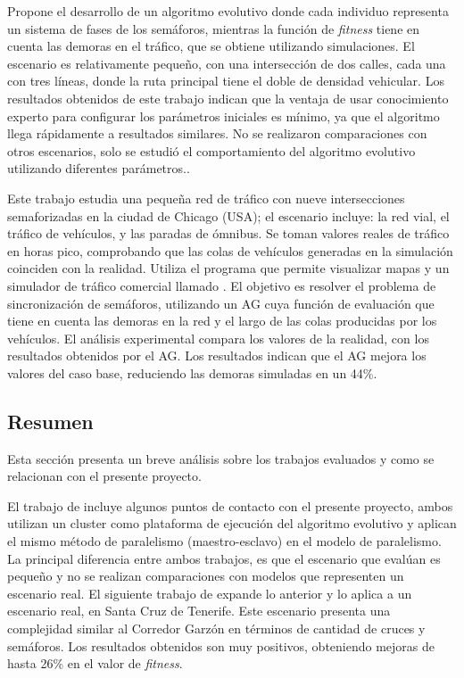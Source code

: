 \begin{itemize}
\begin{item}
Propone el desarrollo de un algoritmo evolutivo donde cada individuo representa un sistema de fases de los semáforos, mientras la función de \emph{fitness} tiene en cuenta las demoras en el tráfico, que se obtiene utilizando simulaciones. El escenario es relativamente pequeño, con una intersección de dos calles, cada una con tres líneas, donde la ruta principal tiene el doble de densidad vehicular. Los resultados obtenidos de este trabajo indican que la ventaja de usar conocimiento experto para configurar los parámetros iniciales es mínimo, ya que el algoritmo llega rápidamente a resultados similares. No se realizaron comparaciones con otros escenarios, solo se estudió el comportamiento del algoritmo evolutivo utilizando diferentes parámetros..

\end{item}	

\begin{item}

Este trabajo estudia una pequeña red de tráfico con nueve intersecciones semaforizadas en la ciudad de Chicago (USA); el escenario incluye: la red vial, el tráfico de vehículos,  y las paradas de ómnibus. Se toman valores reales de tráfico en horas pico, comprobando que las colas de vehículos generadas en la simulación coinciden con la realidad. Utiliza el programa \citet{TRANSYT-7F} que permite visualizar mapas y un simulador de tráfico comercial llamado \citet{CORSIM}. El objetivo es resolver el problema de sincronización de semáforos, utilizando un AG cuya función de evaluación que tiene en cuenta las demoras en la red y el largo de las colas producidas por los vehículos. El análisis experimental compara los valores de la realidad, con los resultados obtenidos por el AG. Los resultados indican que el AG mejora los valores del caso base, reduciendo las demoras simuladas en un 44\%.

\end{item}	
	
\end{itemize}


\subsection{Resumen}
Esta sección presenta un breve análisis sobre los trabajos evaluados y como se relacionan con el presente proyecto.

El trabajo de \citet{Sanchez2004} incluye algunos puntos de contacto con el presente proyecto, ambos utilizan un cluster como plataforma de ejecución del algoritmo evolutivo y aplican el mismo método de paralelismo (maestro-esclavo) en el modelo de paralelismo. La principal diferencia entre ambos trabajos, es que el escenario que evalúan es pequeño y no se realizan comparaciones con modelos que representen un escenario real. El siguiente trabajo de \citet{Sanchez2008} expande lo anterior y lo aplica a un escenario real, en Santa Cruz de Tenerife. Este escenario presenta una complejidad similar al Corredor Garzón en términos de cantidad de cruces y semáforos. Los resultados obtenidos son muy positivos, obteniendo mejoras de hasta 26\% en el valor de \emph{fitness}.

